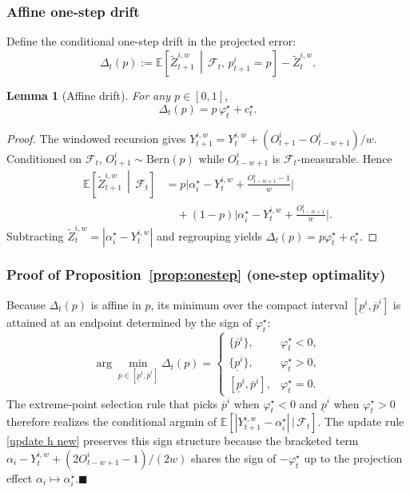 \documentclass[a4paper,fleqn]{cas-dc}
\theoremstyle{plain}
\newtheorem{lemma}{Lemma}
\theoremstyle{remark}
\theoremstyle{plain}
\begin{document}
\subsubsection{Affine one-step drift}
Define the conditional one-step drift in the projected error:
\begin{equation*}
\Delta_t(p):=\mathbb{E}\!\left[\tilde Z_{t+1}^{i,w}\,\middle|\,\mathcal{F}_t,\,p_{t+1}^i=p\right]-\tilde Z_t^{i,w}.
\end{equation*}

\begin{lemma}[Affine drift]\label{lem:affine}
For any $p\in[0,1]$,
\begin{equation}\label{eq:affine-drift}
\Delta_t(p)=p\,\varphi_t^\star+c_t^\star.
\end{equation}
\end{lemma}

\begin{proof}
The windowed recursion gives $Y_{t+1}^{i,w}=Y_t^{i,w}+(O_{t+1}^i-O_{t-w+1}^i)/w$. Conditioned on $\mathcal{F}_t$, $O_{t+1}^i\sim\mathrm{Bern}(p)$ while $O_{t-w+1}^i$ is $\mathcal{F}_t$-measurable. Hence
\begin{align*}
\mathbb{E}\!\left[\tilde Z_{t+1}^{i,w}\,\middle|\,\mathcal{F}_t\right]
&=p\big|\alpha_i^\star-Y_t^{i,w}+\tfrac{O_{t-w+1}^i-1}{w}\big|\\
&\quad+(1-p)\big|\alpha_i^\star-Y_t^{i,w}+\tfrac{O_{t-w+1}^i}{w}\big|.
\end{align*}
Subtracting $\tilde Z_t^{i,w}=|\alpha_i^\star-Y_t^{i,w}|$ and regrouping yields $\Delta_t(p)=p\varphi_t^\star+c_t^\star$.
\end{proof}

\subsubsection{Proof of Proposition~\ref{prop:onestep} (one-step optimality)}

Because $\Delta_t(p)$ is affine in $p$, its minimum over the compact interval $[\underline p^i,\overline p^i]$ is attained at an endpoint determined by the sign of $\varphi_t^\star$:
\begin{equation*}
\arg\min_{p\in[\underline p^i,\overline p^i]}\Delta_t(p)=
\begin{cases}
\{\overline p^i\}, & \varphi_t^\star<0,\\
\{\underline p^i\}, & \varphi_t^\star>0,\\
[\underline p^i,\overline p^i], & \varphi_t^\star=0.
\end{cases}
\end{equation*}
The extreme-point selection rule that picks $\overline p^i$ when $\varphi_t^\star<0$ and $\underline p^i$ when $\varphi_t^\star>0$ therefore realizes the conditional argmin of $\mathbb{E}[|Y_{t+1}^{i,w}-\alpha_i^\star|\,|\,\mathcal{F}_t]$. The update rule \eqref{update h new} preserves this sign structure because the bracketed term $\alpha_i-Y_t^{i,w}+(2O_{t-w+1}^i-1)/(2w)$ shares the sign of $-\varphi_t^\star$ up to the projection effect $\alpha_i\mapsto\alpha_i^\star$.\hfill$\blacksquare$
\end{document}
